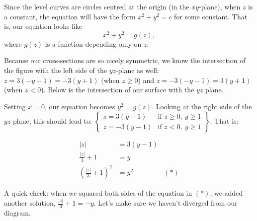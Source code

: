 \begin{solution}
Since the level curves are circles centred at the origin (in the $xy$-plane), when $z$ is a constant, the equation will have the form $x^2+y^2=c$ for some constant. That is, our equation looks like
\[x^2+y^2=g(z),\] where $g(z)$ is a function depending only on $z$.


Because our cross-sections are so nicely symmetric, we know the intersection of the figure with the left side of the $yz$-plane as well: $z=3(-y-1)=-3(y+1)$ 
(when $z\ge0$) and $z=-3(-y-1)=3(y+1)$ (when $z<0$). Below is the intersection of our surface with the $yz$ plane.

\begin{center}
\end{center}

Setting $x=0$, our equation becomes $y^2=g(z)$. Looking at the right side of the $yz$ plane, this should lead to:
$\left.\begin{cases}
z=3(y-1) &\mbox{if } z\geq 0,\ y\ge 1\\
z=-3(y-1) &\mbox{if } z< 0,\ y\ge 1
\end{cases}\right\} $. That is:

\begin{align*}
|z|&=3(y-1)\\
\frac{|z|}{3}+1&=y\\
\left(\frac{|z|}{3}+1\right)^2&=y^2 &(*)
\end{align*}

A quick check: when we squared both sides of the equation in $(*)$, we added another solution, $\frac{|z|}{3}+1=-y$. Let's make sure we haven't diverged from our diagram.


\end{solution}
